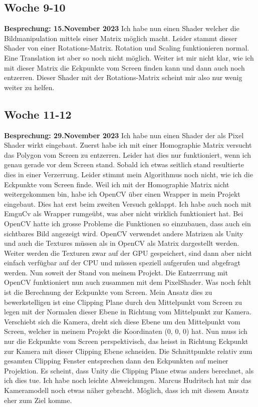 \subsection{Woche 9-10}
\textbf{Besprechung: 15.November 2023}
Ich habe nun einen Shader welcher die Bildmanipulation mittels einer Matrix möglich macht. Leider stammt dieser Shader von einer Rotations-Matrix. Rotation und Scaling funktionieren normal. Eine Translation ist aber so noch nicht möglich. Weiter ist mir nicht klar, wie ich mit dieser Matrix die Eckpunkte vom Screen finden kann und dann auch noch entzerren. Dieser Shader mit der Rotations-Matrix scheint mir also nur wenig weiter zu helfen.

\subsection{Woche 11-12}
\textbf{Besprechung: 29.November 2023}
Ich habe nun einen Shader der als Pixel Shader wirkt eingebaut. Zuerst habe ich mit einer Homographie Matrix versucht das Polygon vom Screen zu entzerren. Leider hat dies nur funktioniert, wenn ich genau gerade vor dem Screen stand. Sobald ich etwas seitlich stand resultierte dies in einer Verzerrung. Leider stimmt mein Algorithmus noch nicht, wie ich die Eckpunkte vom Screen finde. Weil ich mit der Homographie Matrix nicht weitergekommen bin, habe ich OpenCV über einen Wrapper in mein Projekt eingebaut. Dies hat erst beim zweiten Versuch geklappt. Ich habe auch noch mit EmguCv als Wrapper rumgeübt, was aber nicht wirklich funktioniert hat.
Bei OpenCV hatte ich grosse Probleme die Funktionen so einzubauen, dass auch ein sichtbares Bild angezeigt wird. OpenCV verwendet andere Matrizen als Unity und auch die Textures müssen als in OpenCV als Matrix dargestellt werden. Weiter werden die Texturen zwar auf der GPU gespeichert, sind dann aber nicht einfach verfügbar auf der CPU und müssen speziell aufgerufen und abgefragt werden. Nun soweit der Stand von meinem Projekt. Die Entzerrrung mit OpenCV funktioniert nun auch zusammen mit dem PixelShader. 
Was noch fehlt ist die Berechnung der Eckpunkte vom Screen. Mein Ansatz dies zu bewerkstelligen ist eine Clipping Plane durch den Mittelpunkt vom Screen zu legen mit der Normalen dieser Ebene in Richtung vom Mittelpunkt zur Kamera. Verschiebt sich die Kamera, dreht sich diese Ebene um den Mittelpunkt vom Screen, welcher in meinem Projekt die Koordinaten (0, 0, 0) hat. Nun muss ich nur die Eckpunkte vom Screen perspektivisch, das heisst in Richtung Eckpunkt zur Kamera mit dieser Clipping Ebene schneiden. Die Schnittpunkte relativ zum gesamten Clipping Fenster entsprechen dann den Eckpunkten auf meiner Projektion. 
Es scheint, dass Unity die Clipping Plane etwas anders berechnet, als ich dies tue. Ich habe noch leichte Abweichungen.
Marcus Hudritsch hat mir das Kameramodell noch etwas näher gebracht. Möglich, dass ich mit diesem Ansatz eher zum Ziel komme.

